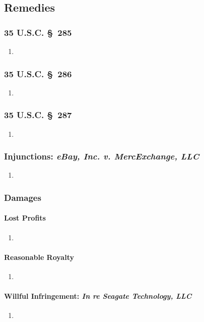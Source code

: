 \subsection{Remedies}

\subsubsection{35 U.S.C. \S\ 285} %

\begin{enumerate}
    \item 
\end{enumerate}

\subsubsection{35 U.S.C. \S\ 286} %

\begin{enumerate}
    \item 
\end{enumerate}

\subsubsection{35 U.S.C. \S\ 287} %

\begin{enumerate}
    \item 
\end{enumerate}

\subsubsection{Injunctions: \emph{eBay, Inc. v. MercExchange, LLC}} %

\begin{enumerate}
    \item 
\end{enumerate}

\subsubsection{Damages}

\paragraph{Lost Profits} %

\begin{enumerate}
    \item 
\end{enumerate}

\paragraph{Reasonable Royalty} %

\begin{enumerate}
    \item 
\end{enumerate}

\paragraph{Willful Infringement: \emph{In re Seagate Technology, LLC}} %

\begin{enumerate}
    \item 
\end{enumerate}

